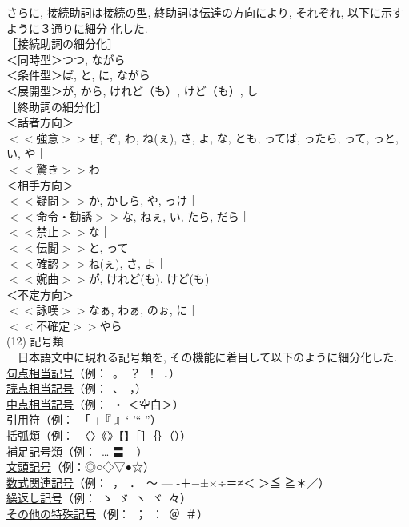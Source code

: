 さらに, 接続助詞は接続の型\cite{Ikehara1990,Minami1974,Minami1993}, 
終助詞は伝達の方向\cite{Ikehara1990,Shirai1992,Saeki1983}により, 
それぞれ, 以下に示すように３通りに細分
化した. \\
［接続助詞の細分化］\\
＜同時型＞つつ, ながら\\
＜条件型＞ば, と, に, ながら\\
＜展開型＞が, から, けれど（も）, けど（も）, し\\
［終助詞の細分化］\\
＜話者方向＞\\
\hspace*{3.5mm}
 \(<<\)強意\(>>\)ぜ, ぞ, わ, ね(ぇ), さ, よ, な, とも, ってば, ったら, って, 
っと, い, や｜\\
\hspace*{3.5mm} \(<<\)驚き\(>>\)わ\\
＜相手方向＞\\
\hspace*{3.5mm} \(<<\)疑問\(>>\)か, かしら, や, っけ｜\\
\hspace*{3.5mm} \(<<\)命令・勧誘\(>>\)な, ねぇ, い, たら, だら｜\\
\hspace*{3.5mm} \(<<\)禁止\(>>\)な｜\\
\hspace*{3.5mm} \(<<\)伝聞\(>>\)と, って｜\\
\hspace*{3.5mm} \(<<\)確認\(>>\)ね(ぇ), さ, よ｜\\
\hspace*{3.5mm} \(<<\)婉曲\(>>\)が, けれど(も), けど(も)\\
＜不定方向＞\\
\hspace*{3.5mm} \(<<\)詠嘆\(>>\)なぁ, わぁ, のぉ, に｜\\
\hspace*{3.5mm} \(<<\)不確定\(>>\)やら\\
(12) 記号類\\
~~日本語文中に現れる記号類を, その機能に着目して以下のように細分化した. \\
\underline{句点相当記号}（例：~。~？~！~．）\\
\underline{読点相当記号}（例：~、~，）\\
\underline{中点相当記号}（例：~・ ＜空白＞）\\
\underline{引用符}（例：~「 」『 』‘ ’“ ”）\\
\underline{括弧類}（例：~〈〉《》【】［］｛｝（））\\
\underline{補足記号類}（例：~… 〓 −）\\
\underline{文頭記号}（例：◎○◇▽●☆）\\
\underline{数式関連記号}（例：~，~．~〜 — ‐＋−±×÷＝≠＜ ＞≦ ≧＊／）\\
\underline{繰返し記号}（例：~ゝ~ゞ~ヽ~ヾ~々）\\
\underline{その他の特殊記号}（例：~；~：~＠~＃）

